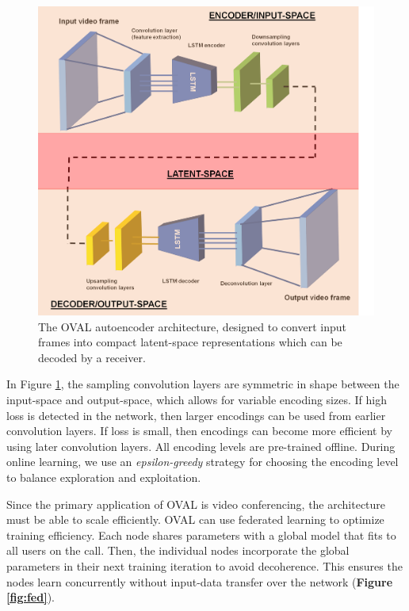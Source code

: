 \documentclass[letter, 12pt]{article}
\begin{document}
\begin{figure}[h!] %
\centering
\includegraphics[width=16cm]{architecture.png}
\caption{The OVAL autoencoder architecture, designed to convert input frames into compact latent-space representations which can be decoded by a receiver. }
\label{fig:arch}
\end{figure}

In Figure \ref{fig:arch}, the sampling convolution layers are symmetric in shape between the input-space and output-space, which allows for variable encoding sizes. If high loss is detected in the network, then larger encodings can be used from earlier convolution layers. If loss is small, then encodings can become more efficient by using later convolution layers. All encoding levels are pre-trained offline. During online learning, we use an \textit{epsilon-greedy} strategy for choosing the encoding level to balance exploration and exploitation.

Since the primary application of OVAL is video conferencing, the architecture must be able to scale efficiently. OVAL can use federated learning to optimize training efficiency. Each node shares parameters with a global model that fits to all users on the call. Then, the individual nodes incorporate the global parameters in their next training iteration to avoid decoherence. This ensures the nodes learn concurrently without input-data transfer over the network (\textbf{Figure \ref{fig:fed}}).
\end{document}
